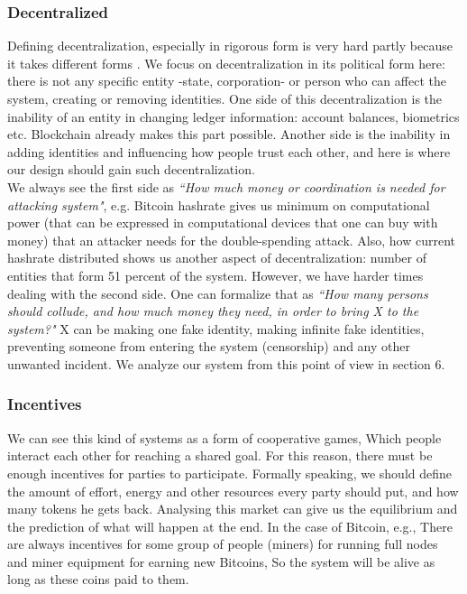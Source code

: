 \documentclass[conference]{IEEEtran}
\begin{document}
\subsubsection{Decentralized}
Defining decentralization, especially in rigorous form is very hard partly because it takes different forms \cite{meaning-of-decentralization}. We focus on decentralization in its political form here: there is not any specific entity -state, corporation- or person who can affect the system, creating or removing identities. One side of this decentralization is the inability of an entity in changing ledger information: account balances, biometrics etc. Blockchain already makes this part possible. Another side is the inability in adding identities and influencing how people trust each other, and here is where our design should gain such decentralization.
\\
We always see the first side as \textit{``How much money or coordination is needed for attacking system"}, e.g. Bitcoin hashrate gives us minimum on computational power (that can be expressed in computational devices that one can buy with money) that an attacker needs for the double-spending attack. Also, how current hashrate distributed shows us another aspect of decentralization: number of entities that form 51 percent of the system. However, we have harder times dealing with the second side. One can formalize that as \textit{``How many persons should collude, and how much money they need, in order to bring X to the system?"} X can be making one fake identity, making infinite fake identities, preventing someone from entering the system (censorship) and any other unwanted incident. We analyze our system from this point of view in section 6. 


\subsubsection{Incentives}
We can see this kind of systems as a form of cooperative games, Which people interact each other for reaching a shared goal. For this reason, there must be enough incentives for parties to participate. Formally speaking, we should define the amount of effort, energy and other resources every party should put, and how many tokens he gets back. Analysing this market can give us the equilibrium and the prediction of what will happen at the end. In the case of Bitcoin, e.g., There are always incentives for some group of people (miners) for running full nodes and miner equipment for earning new Bitcoins, So the system will be alive as long as these coins paid to them.
\end{document}
